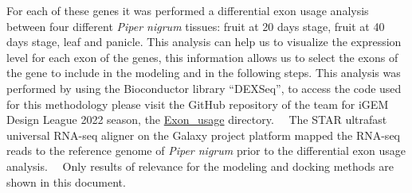 \documentclass[12pt]{article}
\begin{document}
	For each of these genes it was performed a differential exon usage analysis between four different \textit{Piper nigrum} tissues: fruit at 20 days stage, fruit at 40 days stage, leaf and panicle. This analysis can help us to visualize the expression level for each exon of the genes, this information allows us to select the exons of the gene to include in the modeling and in the following steps. This analysis was performed by using the Bioconductor library ``DEXSeq'', to access the code used for this methodology please visit the GitHub repository of the team for iGEM Design League 2022 season, the \href{https://github.com/GerardoCMM/Synthetic-Biobots-IGEM-DL-2022/tree/main/Exon_usage}{Exon\_usage} directory. \cite{bioconductor,dexseq,dexseq_2}\ \ The STAR ultrafast universal RNA-seq aligner on the Galaxy project platform mapped the RNA-seq reads to the reference genome of \textit{Piper nigrum} prior to the differential exon usage analysis. \cite{genome,star,galaxy}\ \ Only results of relevance for the modeling and docking methods are shown in this document.
	
	
	
\end{document}
